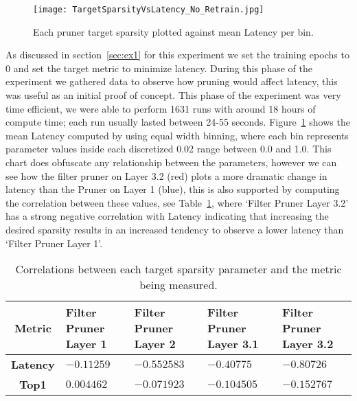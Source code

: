\documentclass[../Dissertation.tex]{subfiles}
\begin{document}
\begin{figure}[H]
    \texttt{[image: TargetSparsityVsLatency\_No\_Retrain.jpg]}
    \caption{Each pruner target sparsity plotted against mean Latency per bin.}
    \label{fig:fastPruneParamVSLatency}
\end{figure}

As discussed in section~\ref{sec:ex1} for this experiment we set the training epochs to 0 and set the target metric to minimize latency. 
During this phase of the experiment we gathered data to observe how pruning would affect latency, this was useful as an initial proof of concept.
This phase of the experiment was very time efficient, we were able to perform 1631 runs with around 18 hours of compute time; each run usually lasted between 24-55 seconds. 
Figure~\ref{fig:fastPruneParamVSLatency} shows the mean Latency computed by using equal width binning, where each bin represents parameter values inside each discretized 0.02 range between 0.0 and 1.0.
This chart does obfuscate any relationship between the parameters, however we can see how the filter pruner on Layer 3.2 (red) plots a more dramatic change in latency than the Pruner on Layer 1 (blue), this is also supported by computing the correlation between these values, see Table~\ref{tab:fastPruneCorrelations}, where `Filter Pruner Layer 3.2' has a strong negative correlation with Latency indicating that increasing the desired sparsity results in an increased tendency to observe a lower latency than `Filter Pruner Layer 1'.

\singlespacing
\begin{table}[H]
    \centering
    \begin{tabular}{@{}cp{26mm}p{26mm}p{26mm}p{26mm}@{}}
    \toprule
    \textbf{Metric}  & \textbf{Filter Pruner  Layer 1} & \textbf{Filter Pruner Layer 2} & \textbf{Filter Pruner Layer 3.1} & \textbf{Filter Pruner Layer 3.2} \\ \midrule
    \textbf{Latency} & $-0.11259$                        & $-0.552583$                      & $-0.40775$                         & $-0.80726$                         \\
    \textbf{Top1}    & $0.004462$                        & $-0.071923$                      & $-0.104505$                        & $-0.152767$                        \\ \bottomrule
    \end{tabular}
    \caption{Correlations between each target sparsity parameter and the metric being measured.}
    \label{tab:fastPruneCorrelations}
\end{table}
\doublespacing
\end{document}
